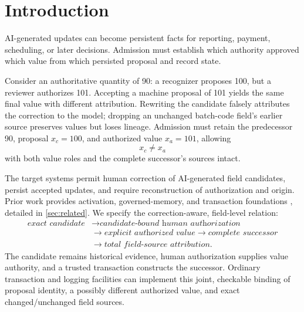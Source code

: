 \section{Introduction}
\label{sec:introduction}

AI-generated updates can become persistent facts for reporting, payment, scheduling, or later decisions. Admission must establish which authority approved which value from which persisted proposal and record state.

Consider an authoritative quantity of 90: a recognizer proposes 100, but a reviewer authorizes 101. Accepting a machine proposal of 101 yields the same final value with different attribution. Rewriting the candidate falsely attributes the correction to the model; dropping an unchanged batch-code field's earlier source preserves values but loses lineage. Admission must retain the predecessor 90, proposal $x_c=100$, and authorized value $x_a=101$, allowing
\begin{equation}
x_c\neq x_a
\label{eq:intro-correction}
\end{equation}
with both value roles and the complete successor's sources intact.

The target systems permit human correction of AI-generated field candidates, persist accepted updates, and require reconstruction of authorization and origin. Prior work provides activation, governed-memory, and transaction foundations \citep{he2026continuity,zhou2026latticemind,zhan2026authoritycollapse,saidi2026mutmem,cui2026memtxn}, detailed in \cref{sec:related}. We specify the correction-aware, field-level relation:
\begin{equation}
\begin{aligned}
\textit{exact candidate}
&\rightarrow\textit{candidate-bound human authorization}\\
&\rightarrow\textit{explicit authorized value}
\rightarrow\textit{complete successor}\\
&\rightarrow\textit{total field-source attribution}.
\end{aligned}
\label{eq:admission-chain}
\end{equation}
The candidate remains historical evidence, human authorization supplies value authority, and a trusted transaction constructs the successor. Ordinary transaction and logging facilities can implement this joint, checkable binding of proposal identity, a possibly different authorized value, and exact changed/unchanged field sources.

